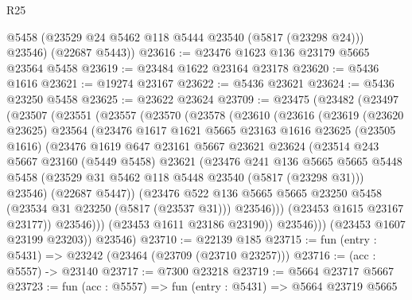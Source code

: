 \begin{lexlean}{R25}
\begin{coremodule}
        @5458
        (@23529 @24 @5462 @118 @5444 @23540 (@5817 (@23298 @24)))
        @23546)
      (@22687 @5443))
@23616 := @23476 @1623 @136 @23179 @5665 @23564 @5458
@23619 := @23484 @1622 @23164 @23178
@23620 := @5436 @1616
@23621 := @19274 @23167
@23622 := @5436 @23621
@23624 := @5436 @23250 @5458
@23625 := @23622 @23624
@23709 := @23475
    (@23482
      (@23497
        (@23507
          (@23551
            (@23557
              (@23570
                (@23578
                  (@23610
                    (@23616
                      (@23619
                        (@23620 @23625)
                        @23564
                        (@23476
                          @1617
                          @1621
                          @5665
                          @23163
                          @1616
                          @23625
                          (@23505 @1616)
                          (@23476
                            @1619
                            @647
                            @23161
                            @5667
                            @23621
                            @23624
                            (@23514
                              @243
                              @5667
                              @23160
                              (@5449 @5458)
                              @23621
                              (@23476
                                @241
                                @136
                                @5665
                                @5665
                                @5448
                                @5458
                                (@23529 @31 @5462 @118 @5448 @23540 (@5817 (@23298 @31)))
                                @23546)
                              (@22687 @5447))
                            (@23476
                              @522
                              @136
                              @5665
                              @5665
                              @23250
                              @5458
                              (@23534 @31 @23250 (@5817 (@23537 @31)))
                              @23546)))
                        (@23453 @1615 @23167 @23177))
                      @23546)))
                (@23453 @1611 @23186 @23190))
              @23546)))
        (@23453 @1607 @23199 @23203))
      @23546)
@23710 := @22139 @185
@23715 := fun (entry : @5431) => @23242 (@23464 (@23709 (@23710 @23257)))
@23716 := (acc : @5557) -> @23140
@23717 := @7300 @23218
@23719 := @5664 @23717 @5667
@23723 := fun (acc : @5557) => fun (entry : @5431) => @5664 @23719 @5665

\end{coremodule}
\end{lexlean}
